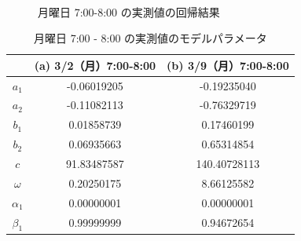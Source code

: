 \documentclass[technicalreport]{ieicej}
\begin{document}
\begin{figure}[tb]
\begin{center}
~
~
\caption{月曜日 7:00-8:00 の実測値の回帰結果}
\label{norm-reg}
\end{center}
\end{figure}

\begin{table}[tb]
\centering
\caption{月曜日 7:00 - 8:00 の実測値のモデルパラメータ}
\label{norm-param}
\begin{tabular}{|c|c|c|}
\hline
&(a) 3/2（月）7:00-8:00&(b) 3/9（月）7:00-8:00\\
\hline
$a_1$&-0.06019205&-0.19235040\\
\hline
$a_2$&-0.11082113&-0.76329719\\
\hline
$b_1$&0.01858739&0.17460199\\
\hline
$b_2$&0.06935663&0.65314854\\
\hline
$c$&91.83487587&140.40728113\\
\hline
$\omega$&0.20250175&8.66125582\\
\hline
$\alpha_1$&0.00000001&0.00000001\\
\hline
$\beta_1$&0.99999999&0.94672654\\
\hline
\end{tabular}
\end{table}
\end{document}
